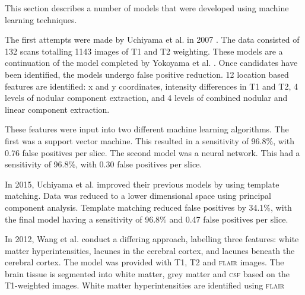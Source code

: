 This section describes a number of models that were developed using machine learning techniques. 

The first attempts were made by Uchiyama et al. in 2007 \cite{Uchiyama20071554, Uchiyama2007b}. The data consisted of 132 scans totalling 1143 images of T1 and T2 weighting. These models are a continuation of the model completed by Yokoyama et al. \cite{Yokoyama2007}. Once candidates have been identified, the models undergo false positive reduction. 12 location based features are identified: x and y coordinates, intensity differences in T1 and T2, 4 levels of nodular component extraction, and 4 levels of combined nodular and linear component extraction.

These features were input into two different machine learning algorithms. The first was a support vector machine. This resulted in a sensitivity of 96.8\%, with 0.76 false positives per slice. The second model was a neural network. This had a sensitivity of 96.8\%, with 0.30 false positives per slice.

In 2015, Uchiyama et al. \cite{Uchiyama2015} improved their previous models by using template matching. Data was reduced to a lower dimensional space using principal component analysis. Template matching reduced false positives by 34.1\%, with the final model having a sensitivity of 96.8\% and 0.47 false positives per slice.

In 2012, Wang et al. \cite{WangY.2012Msow} conduct a differing approach, labelling three features: white matter hyperintensities, lacunes in the cerebral cortex, and lacunes beneath the cerebral cortex. The model was provided with T1, T2 and \textsc{flair} images. The brain tissue is segmented into white matter, grey matter and \textsc{csf} based on the T1-weighted images. White matter hyperintensities are identified using \textsc{flair}



